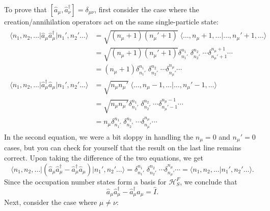 \documentclass[prx,12pt]{revtex4-2}
\begin{document}
To prove that $[\hat{a}_\mu,\hat{a}_\nu^\dagger] = \delta_{\mu\nu}$,
first consider the case where the creation/annihilation operators act
on the same single-particle state:
\begin{align}
  \begin{aligned}\big\langle n_1, n_2, \dots \big| \hat{a}_\mu \hat{a}_\mu^\dagger \big| n_1', n_2'\dots\big\rangle &= \sqrt{(n_\mu+1)(n_\mu'+1)}\; \big\langle \dots, n_\mu+1, \dots \big| \dots, n_\mu'+1, \dots\big\rangle \\ &= \sqrt{(n_\mu+1)(n_\mu'+1)} \delta^{n_1}_{n_1'} \; \delta^{n_2}_{n_2'} \; \cdots \delta^{n_\mu+1}_{n_\mu'+1}\cdots \\ &= (n_\mu+1) \delta^{n_1}_{n_1'} \; \delta^{n_2}_{n_2'} \; \cdots \delta^{n_\mu}_{n_\mu'}\cdots \\ \big\langle n_1, n_2, \dots \big| \hat{a}_\mu^\dagger \hat{a}_\mu \big| n_1', n_2'\dots\big\rangle &= \sqrt{n_\mu n_\mu'}\; \big\langle \dots, n_\mu-1, \dots \big| \dots, n_\mu'-1, \dots\big\rangle \\&= \sqrt{n_\mu n_\mu'} \delta^{n_1}_{n_1'} \; \delta^{n_2}_{n_2'} \; \cdots \delta^{n_\mu-1}_{n_\mu'-1}\cdots \\ &= n_\mu \delta^{n_1}_{n_1'} \; \delta^{n_2}_{n_2'} \; \cdots \delta^{n_\mu}_{n_\mu'}\cdots \end{aligned}
\end{align}
In the second equation, we were a bit sloppy in handling the $n_\mu =
0$ and $n_\mu' = 0$ cases, but you can check for yourself that the
result on the last line remains correct.  Upon taking the
difference of the two equations, we get
\begin{equation}
  \big\langle n_1, n_2, \dots \big| \left(\hat{a}_\mu \hat{a}_\mu^\dagger - \hat{a}_\mu^\dagger \hat{a}_\mu\right) \big| n_1', n_2'\dots\big\rangle = \delta^{n_1}_{n_1'} \; \delta^{n_2}_{n_2'} \; \cdots \delta^{n_\mu}_{n_\mu'}\cdots = \big\langle n_1, n_2, \dots \big| n_1', n_2'\dots\big\rangle.
\end{equation}
Since the occupation number states form a basis for $\mathscr{H}^F_S$,
we conclude that
\begin{equation}
  \hat{a}_\mu \hat{a}_\mu^\dagger - \hat{a}_\mu^\dagger \hat{a}_\mu = \hat{I}.
\end{equation}
Next, consider the case where $\mu \ne \nu$:
\end{document}
